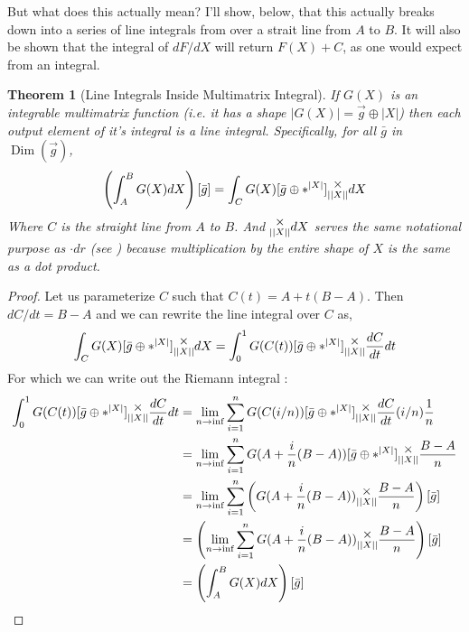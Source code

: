 \documentclass[12pt]{book}
\theoremstyle{plain}
\newtheorem{theorem}{Theorem}[chapter]
\theoremstyle{definition}
\theoremstyle{ppart}
\theoremstyle{case}
\theoremstyle{solution}
\DeclareMathOperator{\Dim}{Dim}
\newcommand{\mmult}[1]{\text{\raisebox{1ex}{$\underset{#1}{\times}$}}}
\newcommand{\shape}[1]{\left|#1\right|}
\begin{document}
\begin{landscape}
But what does this actually mean? I'll show, below, that this actually breaks down into
a series of line integrals from over a strait line from $A$ to $B$. It will also be
shown that the integral of $dF/dX$ will return $F(X) + C$, as one would expect from an
integral.

\begin{theorem}[Line Integrals Inside Multimatrix Integral]
\label{line_inside}
If $G(X)$ is an integrable multimatrix function (i.e. it has a shape
$\shape{G(X)} = \vec{g} \oplus \shape{X}$) then each output element of it's
integral is a line integral.
Specifically, for all $\bar{g}$ in $\Dim(\vec{g})$,
\[ \left(\int_A^B G(X) dX\right)[\bar{g}] = \int_C G(X)[\bar{g} \oplus *^{\shape{X}}] \mmult{\shape{\shape{X}}} dX \]
Where $C$ is the straight line from $A$ to $B$. And $\mmult{\shape{\shape{X}}} dX$ serves the same notational purpose as
$\cdot dr$ (see \cite{wiki:line_int}) because multiplication by the entire shape of $X$ is the same as a dot product.
\end{theorem}
\begin{proof}
Let us parameterize $C$ such that $C(t) = A + t(B-A)$. Then $dC/dt = B-A$ and
we can rewrite the line integral over $C$ as,
\[ \int_C G(X)[\bar{g} \oplus *^{\shape{X}}] \mmult{\shape{\shape{X}}} dX = \int_0^1 G(C(t))[\bar{g} \oplus *^{\shape{X}}] \mmult{\shape{\shape{X}}} \frac{dC}{dt} dt \]
For which we can write out the Riemann integral \cite{wiki:riemann_int}:
\begin{align*}
  \int_0^1 G(C(t))[\bar{g} \oplus *^{\shape{X}}] \mmult{\shape{\shape{X}}} \frac{dC}{dt} dt
  &=
  \lim_{n \to \inf} \sum_{i=1}^n G(C(i/n))[\bar{g} \oplus *^{\shape{X}}] \mmult{\shape{\shape{X}}} \frac{dC}{dt}(i/n) \frac{1}{n} \\
  &=
  \lim_{n \to \inf} \sum_{i=1}^n G(A + \frac{i}{n}(B-A))[\bar{g} \oplus *^{\shape{X}}] \mmult{\shape{\shape{X}}} \frac{B-A}{n} \\
  &=
  \lim_{n \to \inf} \sum_{i=1}^n \left( G(A + \frac{i}{n}(B-A)) \mmult{\shape{\shape{X}}} \frac{B-A}{n} \right)[\bar{g}] \\
  &=
  \left( \lim_{n \to \inf} \sum_{i=1}^n G(A + \frac{i}{n}(B-A)) \mmult{\shape{\shape{X}}} \frac{B-A}{n} \right)[\bar{g}] \\
  &=
  \left(\int_A^B G(X) dX\right)[\bar{g}] 
\end{align*}
\end{proof}
\end{landscape}
\end{document}
